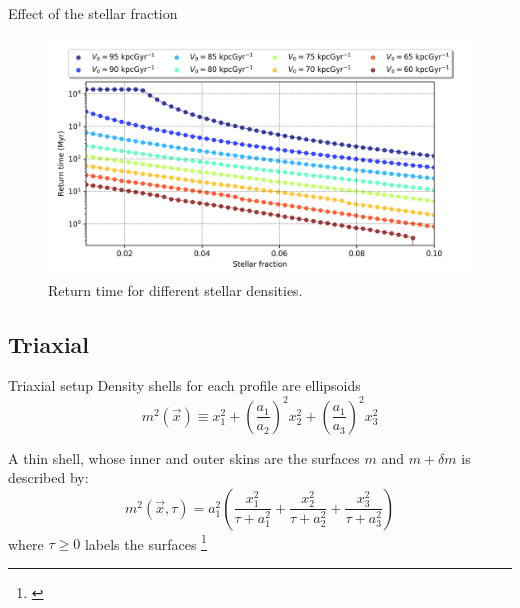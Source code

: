 \documentclass{beamer}
\newcommand\blfootnote[1]
{%
	\begingroup
	\renewcommand\thefootnote{}\footnote{#1}%
	\addtocounter{footnote}{-1}%
	\endgroup
}
\newcommand{\fcite}[1]{\blfootnote{\tiny\cite{#1}}}
\begin{document}
\begin{frame}{Effect of the stellar fraction}
	\begin{figure}[h]
		\centering
		\includegraphics[width=0.9\linewidth]{"../Files/Week 7/Symmetric/returntimes_stellar_speed"}
		\caption{Return time for different stellar densities.}
	\end{figure}
\end{frame}

\subsection{Triaxial}
\begin{frame}{Triaxial setup}
	Density shells for each profile are ellipsoids
	\begin{equation}
		m^2(\vec{x}) \equiv x_1^2 + \left(\dfrac{a_1}{a_2}\right)^2x_2^2 + \left(\dfrac{a_1}{a_3}\right)^2x_3^2
	\end{equation}
	
	A thin shell, whose inner and outer skins are the surfaces $m$ and $m + \delta m$ is described by:
	\begin{equation}\label{eq: m2}
	m^2(\vec{x}, \tau) = a_1^2\left(\frac{x_1^{2}}{\tau + a_{1}^{2}} + \frac{x_2^{2}}{\tau + a_{2}^{2}} + \frac{x_3^{2}}{\tau + a_{3}^{2}}\right)
	\end{equation}
	 where $\tau \geq 0$ labels the surfaces \fcite{binney2011galactic}
\end{frame}
\end{document}
